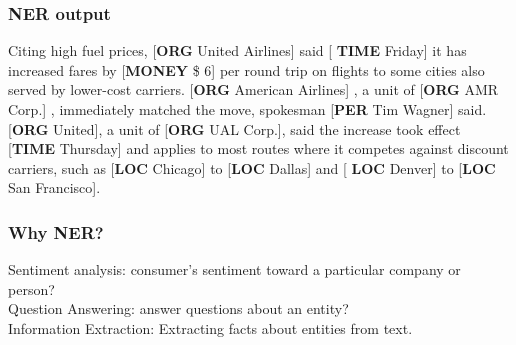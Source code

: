 \documentclass[13.5pt,aspecratio=169]{beamer}
\begin{document}
    
    
    
    \begin{frame}
    \onehalfspacing
        \frametitle{NER output}
        
        \begin{block}{}
            Citing high fuel prices, \color{blue}[\textbf{ORG}  United Airlines] \color{black} said \color{blue} [ \textbf{TIME} Friday] \color{black} it has increased fares by \color{blue} [\textbf{MONEY} \$ 6] \color{black} per round trip on flights to some cities also served by lower-cost carriers. \color{blue}[\textbf{ORG} American Airlines] \color{black}, a unit of \color{blue}[\textbf{ORG} AMR Corp.] \color{black}, immediately matched the move, spokesman \color{blue}[\textbf{PER} Tim Wagner] \color{black}said. \color{blue}[\textbf{ORG} United]\color{black}, a unit of \color{blue}[\textbf{ORG} UAL Corp.]\color{black}, said the increase took effect \color{blue}[\textbf{TIME} Thursday] \color{black} and applies to most routes where it competes against discount carriers, such as \color{blue}[\textbf{LOC} Chicago] \color{black} to \color{blue}[\textbf{LOC} Dallas] \color{black} and \color{blue}[ \textbf{LOC} Denver] \color{black}to \color{blue}[\textbf{LOC} San Francisco]\color{black}.
        \end{block}	
    \end{frame}
    \begin{frame}
    \onehalfspacing
        \frametitle{Why NER?}	
        \begin{block}{}
            Sentiment analysis: consumer’s sentiment toward a particular company or person?
            \\  \bigskip
                 Question Answering: answer questions about an entity?
              \\  \bigskip
                 Information Extraction: Extracting facts about entities from text.
        \end{block}	
    \end{frame}
\end{document}
